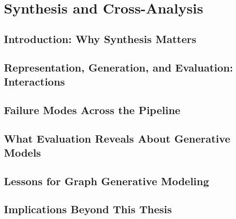 \chapter{Synthesis and Cross-Analysis}
\label{ch:synthesis}

\section{Introduction: Why Synthesis Matters}
\label{sec:synth:intro}

\section{Representation, Generation, and Evaluation: Interactions}
\label{sec:synth:interactions}

\section{Failure Modes Across the Pipeline}
\label{sec:synth:failures}

\section{What Evaluation Reveals About Generative Models}
\label{sec:synth:evaluation}

\section{Lessons for Graph Generative Modeling}
\label{sec:synth:lessons}

\section{Implications Beyond This Thesis}
\label{sec:synth:implications}
